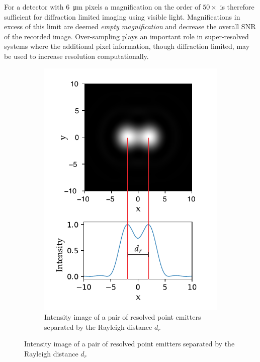 For a detector with \SI{6}{\micro\meter} pixels a magnification on the order of $50\times$ is therefore sufficient for diffraction limited imaging using visible light.
Magnifications in excess of this limit are deemed \emph{empty magnification} and decrease the overall SNR of the recorded image.
Over-sampling plays an important role in super-resolved systems where the additional pixel information, though diffraction limited, may be used to increase resolution computationally.

\begin{figure}
    \centering
    \begin{subfigure}[b]{\textwidth}
        \centering
        \includegraphics{./sampling/sample_master}
        \caption{Intensity image of a pair of resolved point emitters separated by the Rayleigh distance $d_{r}$}
        \label{fig:sample_master}
    \end{subfigure}
\end{figure}~
